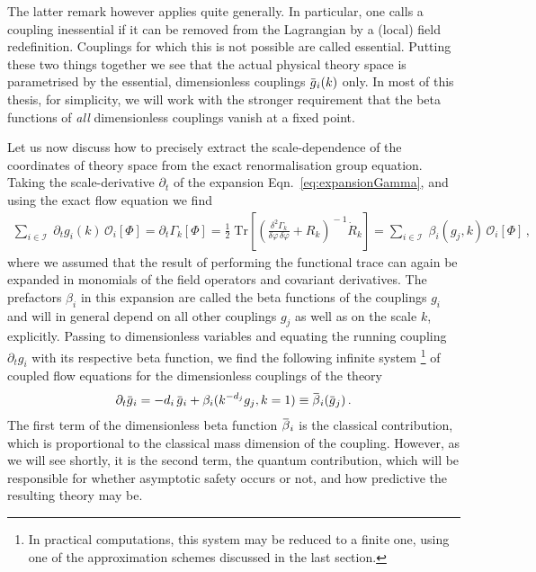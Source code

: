 \documentclass[11pt]{book}
\newcommand{\overbar}[1]{\mkern 1.5mu\overline{\mkern-1.5mu#1\mkern-1.5mu}\mkern 1.5mu}
\newcommand{\Tr}{\mathrm{Tr}}
\numberwithin{equation}{chapter}
\begin{document}
The latter remark however applies quite generally. In particular, one calls
a coupling inessential if it can be removed from the Lagrangian
by a (local) field redefinition. Couplings for which this is not possible
are called essential. Putting these two things together
we see that the actual physical theory space is parametrised by the
essential, dimensionless couplings $\overbar g_i(k)$ only.
In most of this thesis, for simplicity, we will work with
the stronger requirement that the beta functions of \textit{all}
dimensionless couplings vanish at a fixed point.

Let us now discuss how to precisely extract the scale-dependence
of the coordinates of theory space from the exact renormalisation
group equation. Taking the scale-derivative $\partial_t$
of the expansion Eqn.~\eqref{eq:expansionGamma}, and using the
exact flow equation we find
\begin{align}
  \sum_{i \in \mathcal I} \; \partial_t g_i(k) \, \mathcal O_i [\Phi]
  = \partial_t \Gamma_k[\Phi]
  = \frac 12 \; \Tr
  \left[
    \left(
      \frac{ \delta^2 \Gamma_k }{ \delta \varphi \, \delta \varphi } + R_k
    \right) ^{\!\!-1}
    \! \dot R_k
  \right]
  = \sum_{i \in \mathcal I} \; \beta_i(g_j, k) \, \mathcal O_i [\Phi] \,,
\end{align}
where we assumed that the result of performing the functional trace
can again be expanded in monomials of the field operators and covariant
derivatives. The prefactors $\beta_i$ in this expansion are called
the beta functions of the couplings $g_i$ and will in general depend
on all other couplings $g_j$ as well as on the scale $k$, explicitly.
Passing to dimensionless variables and equating the running coupling
$\partial_t g_i$ with its respective beta function, we find the following
infinite system%
\footnote{
  In practical computations, this system may be reduced to a finite one,
  using one of the approximation schemes discussed in the last section.
}
of coupled flow equations for the dimensionless
couplings of the theory
\begin{align}
  \partial_t \overbar g_i =
  - d_i \, \overbar g_i + \beta_i(k^{-d_j} g_j, k=1)
  \equiv \overbar \beta_i(\overbar g_j) \,.
\end{align}
The first term of the dimensionless beta function $\overbar \beta_i$
is the classical contribution,
which is proportional to the classical mass dimension
of the coupling. However, as we will see shortly,
it is the second term, the quantum contribution,
which will be responsible for whether asymptotic safety
occurs or not, and how predictive the resulting theory may be.
\end{document}
